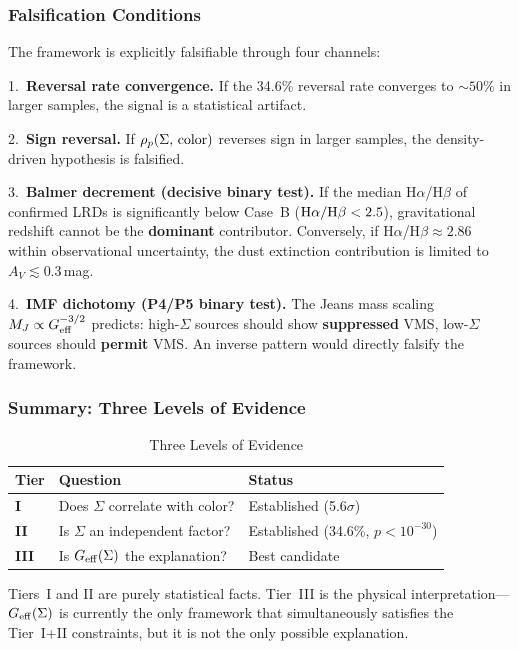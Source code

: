 \documentclass[apj,twocolumn,longbibliography,linenumbers]{aastex701}
\begin{document}
\subsubsection{Falsification Conditions}

The framework is explicitly falsifiable through four channels:

1.~\textbf{Reversal rate convergence.} If the 34.6\% reversal rate converges to ${\sim}50\%$ in larger samples, the signal is a statistical artifact.

2.~\textbf{Sign reversal.} If $\rho_p(\Sigma,\,{\rm color})$ reverses sign in larger samples, the density-driven hypothesis is falsified.

3.~\textbf{Balmer decrement (decisive binary test).} If the median H$\alpha$/H$\beta$ of confirmed LRDs is significantly below Case~B (${\rm H}\alpha/{\rm H}\beta < 2.5$), gravitational redshift cannot be the \textbf{dominant} contributor. Conversely, if H$\alpha$/H$\beta \approx 2.86$ within observational uncertainty, the dust extinction contribution is limited to $A_V \lesssim 0.3$\,mag.

4.~\textbf{IMF dichotomy (P4/P5 binary test).} The Jeans mass scaling $M_J \propto G_{\rm eff}^{-3/2}$ predicts: high-$\Sigma$ sources should show \textbf{suppressed} VMS, low-$\Sigma$ sources should \textbf{permit} VMS. An inverse pattern would directly falsify the framework.

\subsubsection{Summary: Three Levels of Evidence}

\begin{table}[h]
\caption{Three Levels of Evidence}
\label{tab:evidence_levels}
\centering
\footnotesize
\begin{tabular}{lll}
\hline
Tier & Question & Status \\
\hline
\textbf{I} & Does $\Sigma$ correlate with color? & Established (5.6$\sigma$) \\
\textbf{II} & Is $\Sigma$ an independent factor? & Established (34.6\%, $p < 10^{-30}$) \\
\textbf{III} & Is $G_{\rm eff}(\Sigma)$ the explanation? & Best candidate \\
\hline
\end{tabular}
\end{table}

Tiers~I and II are purely statistical facts. Tier~III is the physical interpretation---$G_{\rm eff}(\Sigma)$ is currently the only framework that simultaneously satisfies the Tier~I+II constraints, but it is not the only possible explanation.
\end{document}
